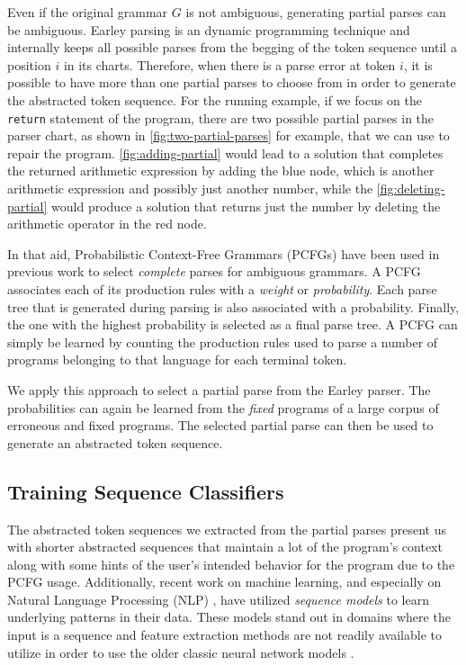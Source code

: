 

 Even if the original grammar $G$ is
not ambiguous, generating partial parses can be ambiguous. Earley parsing is an
dynamic programming technique and internally keeps all possible parses from the
begging of the token sequence until a position $i$ in its charts. Therefore,
when there is a parse error at token $i$, it is possible to have more than one
partial parses to choose from in order to generate the abstracted token
sequence. For the running example, if we focus on the \texttt{return} statement
of the program, there are two possible partial parses in the parser chart, as
shown in \autoref{fig:two-partial-parses} for example, that we can use to repair
the program. \autoref{fig:adding-partial} would lead to a solution that
completes the returned arithmetic expression by adding the blue node, which is
another arithmetic expression and possibly just another number, while the
\autoref{fig:deleting-partial} would produce a solution that returns just the
number by deleting the arithmetic operator in the red node.

In that aid, Probabilistic Context-Free Grammars (PCFGs) have been used in
previous work \citep{Collins_2013, Jelinek_1992} to select \emph{complete}
parses for ambiguous grammars. A PCFG associates each of its production rules
with a \emph{weight} or \emph{probability}. Each parse tree that is generated
during parsing is also associated with a probability. Finally, the one with the
highest probability is selected as a final parse tree. A PCFG can simply be
learned \citep{Collins_2013} by counting the production rules used to parse a
number of programs belonging to that language for each terminal token.

We apply this approach to select a partial parse from the Earley parser. The
probabilities can again be learned from the \emph{fixed} programs of a large
corpus of erroneous and fixed programs. The selected partial parse can then be
used to generate an abstracted token sequence.


\subsection{Training Sequence Classifiers}
\label{sec:overview:train}
The abstracted token sequences we extracted from the partial parses present us
with shorter abstracted sequences that maintain a lot of the program's context
along with some hints of the user's intended behavior for the program due to the
PCFG usage. Additionally, recent work on machine learning, and especially on
Natural Language Processing (NLP) \citep{Sutskever_2014, Hardalov_2018}, have
utilized \emph{sequence models} to learn underlying patterns in their data.
These models stand out in domains where the input is a sequence and feature
extraction methods are not readily available to utilize in order to use the
older classic neural network models \citep{Sutskever_2014}.

